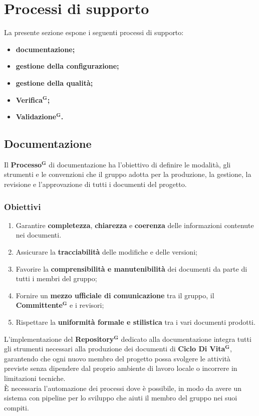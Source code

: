 \documentclass[a4paper,12pt]{article}
\newcommand{\term}[1]{\textbf{#1}$^\mathbf{G}$}
\begin{document}
\section{Processi di supporto}
La presente sezione espone i seguenti processi di supporto:
\begin{itemize}
    \item[(a)] \textbf{documentazione;}
    \item[(b)] \textbf{gestione della configurazione;}
    \item[(c)] \textbf{gestione della qualità;}
    \item[(d)] \textbf{\term{Verifica};}
    \item[(e)] \textbf{\term{Validazione}.}
\end{itemize}

\subsection{Documentazione} \label{sec:documentazione}
Il \term{Processo} di documentazione ha l’obiettivo di definire le modalità, gli strumenti e le convenzioni che il gruppo adotta per la produzione, la gestione, la revisione e l’approvazione di tutti i documenti del progetto.

\subsubsection{Obiettivi}
\begin{enumerate}
  \item Garantire \textbf{completezza}, \textbf{chiarezza} e \textbf{coerenza} delle informazioni contenute nei documenti.
  \item Assicurare la \textbf{tracciabilità} delle modifiche e delle versioni;
   \item Favorire la \textbf{comprensibilità e manutenibilità} dei documenti da parte di tutti i membri del gruppo;
   \item Fornire un \textbf{mezzo ufficiale di comunicazione} tra il gruppo, il \term{Committente} e i revisori;
   \item Rispettare la \textbf{uniformità formale e stilistica} tra i vari documenti prodotti.
\end{enumerate}
L’implementazione del \term{Repository} dedicato alla documentazione integra tutti gli strumenti necessari alla produzione dei documenti di \term{Ciclo Di Vita}, garantendo che ogni nuovo membro del progetto possa svolgere le attività previste senza dipendere dal proprio ambiente di lavoro locale o incorrere in limitazioni tecniche.\\È necessaria l'automazione dei processi dove è possibile, in modo da avere un sistema con pipeline per lo sviluppo che aiuti il membro del gruppo nei suoi compiti.
\end{document}
